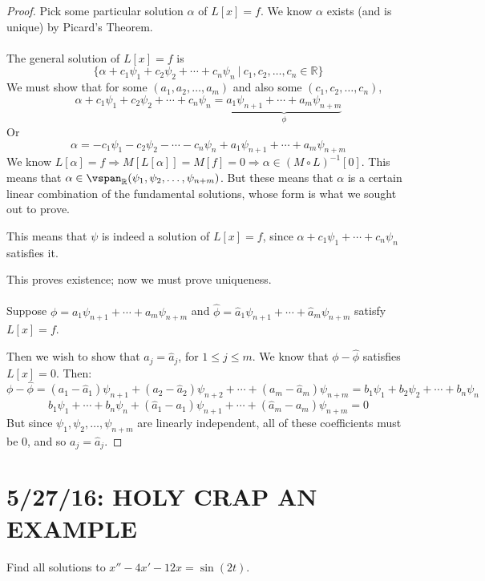 \documentclass[12pt]{article}
\begin{document}
\begin{proof}
Pick some particular solution $\alpha$ of $L[x] = f$. We know $\alpha$ exists (and is unique) by Picard's Theorem. \\ \\
The general solution of $L[x] = f$ is \[ \{ \alpha + c_1\psi_1 + c_2\psi_2 + \cdots + c_n\psi_n \ | \ c_1,c_2,\dots,c_n \in \mathbb{R} \} \]
We must show that for some $(a_1,a_2,\dots,a_m)$ and also some $(c_1,c_2,\dots,c_n)$, \[ \alpha + c_1\psi_1 + c_2\psi_2 + \cdots + c_n\psi_n = \underbrace{a_1\psi_{n+1} + \cdots + a_m\psi_{n+m}}_{\phi} \]
Or \[ \alpha = -c_1\psi_1 - c_2\psi_2 - \cdots - c_n\psi_n + a_1\psi_{n+1} + \cdots + a_m\psi_{n+m} \]
We know $L[\alpha] = f \Rightarrow M[L[\alpha]] = M[f] = 0 \Rightarrow \alpha \in (M \circ L)^{-1}[0]$. This means that $\alpha \in \vspan_{\mathbb{R}}(\psi_1,\psi_2,\dots,\psi_{n+m})$. But these means that $\alpha$ is a certain linear combination of the fundamental solutions, whose form is what we sought out to prove.

This means that $\psi$ is indeed a solution of $L[x] = f$, since $\alpha + c_1\psi_1 + \cdots + c_n\psi_n$ satisfies it.

This proves existence; now we must prove uniqueness. \\ \\

Suppose $\phi = a_1\psi_{n+1} + \cdots + a_m\psi_{n+m}$ and $\hat{\phi} = \hat{a}_1\psi_{n+1} + \cdots + \hat{a}_m\psi_{n+m}$ satisfy $L[x] = f$.

Then we wish to show that $a_j = \hat{a}_j$, for $1 \le j \le m$. We know that $\phi - \hat{\phi}$ satisfies $L[x] = 0$. Then:
\[ \phi - \hat{\phi} = (a_1 - \hat{a}_1)\psi_{n+1} + (a_2 - \hat{a}_2)\psi_{n+2} + \cdots + (a_m - \hat{a}_m)\psi_{n+m} = b_1\psi_1 + b_2\psi_2 + \cdots + b_n\psi_n \]
\[ b_1\psi_1 + \cdots + b_n\psi_n + (\hat{a}_1 - a_1)\psi_{n+1} + \cdots + (\hat{a}_m - a_m)\psi_{n+m} = 0 \]
But since $\psi_1,\psi_2,\dots,\psi_{n+m}$ are linearly independent, all of these coefficients must be 0, and so $a_j = \hat{a}_j$.
\end{proof}

\section{5/27/16: HOLY CRAP AN EXAMPLE}

\begin{example}
Find all solutions to $x'' - 4x' - 12x = \sin(2t)$.
\end{example}
\end{document}
